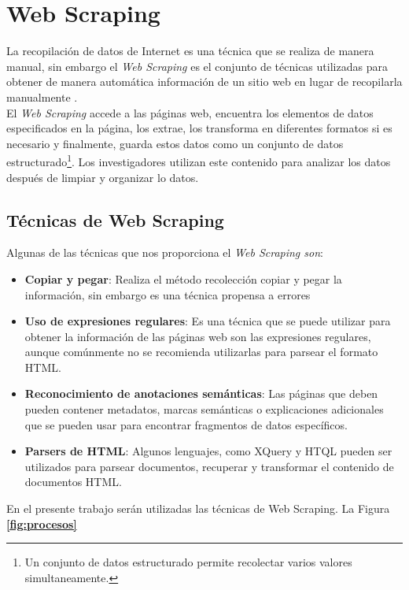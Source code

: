 

\section{Web Scraping}
La recopilación de datos de Internet es una técnica que se realiza de manera manual, sin embargo 
el \textit{Web Scraping} es el conjunto de técnicas utilizadas para obtener de manera automática información de 
un sitio web en lugar de recopilarla manualmente \citep{CTWebScraping}. 
\\
El \textit{Web Scraping} accede a las páginas web, encuentra los elementos de datos especificados en la 
página, los extrae, los transforma en diferentes formatos si es necesario y finalmente, guarda 
estos datos como un conjunto de datos estructurado\footnote{Un conjunto de datos estructurado permite recolectar 
varios valores simultaneamente.}. Los investigadores utilizan este contenido para analizar los datos 
después de limpiar y organizar lo datos.
\subsection{Técnicas de Web Scraping}

Algunas de las técnicas que nos proporciona el \textit{Web Scraping son}:
\begin{itemize}
    \item \textbf{Copiar y pegar}: Realiza el método recolección copiar y pegar la información, 
    sin embargo es una técnica propensa a errores
    \item \textbf{Uso de expresiones regulares}: Es una técnica que se puede utilizar para obtener la información 
    de las páginas web son las expresiones regulares, aunque comúnmente no se recomienda utilizarlas para parsear el formato HTML.
    \item \textbf{Reconocimiento de anotaciones semánticas}: Las páginas que deben pueden contener metadatos, 
    marcas semánticas o explicaciones adicionales que se pueden usar para encontrar fragmentos de datos específicos.
    \item \textbf{Parsers de HTML}: Algunos lenguajes, como XQuery y HTQL pueden ser utilizados para parsear documentos, recuperar 
    y transformar el contenido de documentos HTML.
\end{itemize}
En el presente trabajo serán utilizadas las técnicas de Web Scraping.
La Figura \textbf{\ref{fig:procesos}}

